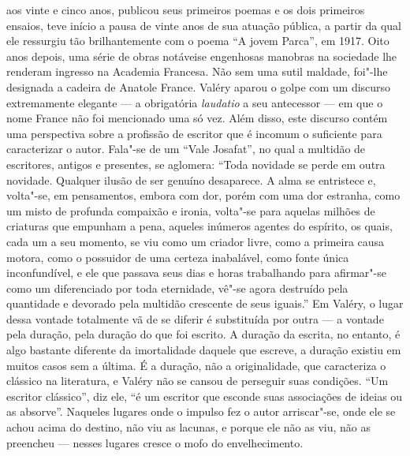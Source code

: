 aos vinte e cinco anos, publicou seus primeiros poemas e os dois
primeiros ensaios, teve início a pausa de vinte anos de sua atuação
pública, a partir da qual ele ressurgiu tão brilhantemente com o poema
``A jovem Parca'', em 1917. Oito anos depois, uma série de obras notáveis
​​e engenhosas manobras na sociedade lhe renderam ingresso na Academia
Francesa. Não sem uma sutil maldade, foi"-lhe designada a cadeira de
Anatole France. Valéry aparou o golpe com um discurso extremamente
elegante --- a obrigatória \emph{laudatio} a seu antecessor --- em que o
nome France não foi mencionado uma só vez. Além disso, este discurso
contém uma perspectiva sobre a profissão de escritor que é incomum o
suficiente para caracterizar o autor. Fala"-se de um ``Vale Josafat'', no
qual a multidão de escritores, antigos e presentes, se aglomera: ``Toda novidade
se perde em outra novidade. Qualquer ilusão de ser genuíno
desaparece. A alma se entristece e, volta"-se, em pensamentos, embora com
dor, porém com uma dor estranha, como um misto de profunda compaixão e ironia,
volta"-se para aquelas milhões de criaturas que empunham a pena, aqueles
inúmeros agentes do espírito, os quais, cada um a seu momento, se viu
como um criador livre, como a primeira causa motora, como o possuidor
de uma certeza inabalável, como fonte única inconfundível, e ele que
passava seus dias e horas trabalhando para afirmar"-se como
um diferenciado por toda eternidade, vê"-se agora destruído
pela quantidade e devorado pela multidão crescente de seus iguais.'' Em
Valéry, o lugar dessa vontade totalmente vã de se diferir é substituída
por outra --- a vontade pela duração, pela duração do que foi escrito. A
duração da escrita, no entanto, é algo bastante diferente da
imortalidade daquele que escreve, a duração existiu em muitos casos sem
a última. É a duração, não a originalidade, que caracteriza o clássico
na literatura, e Valéry não se cansou de perseguir suas condições. ``Um
escritor clássico'', diz ele, ``é um escritor que esconde suas associações
de ideias ou as absorve''. Naqueles lugares onde o impulso fez o autor
arriscar"-se, onde ele se achou acima do destino, não viu as lacunas, e
porque ele não as viu, não as preencheu --- nesses lugares cresce o mofo
do envelhecimento.

